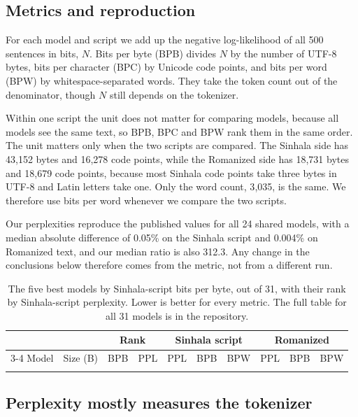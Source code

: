 \documentclass[3p,times,procedia]{elsarticle}
\begin{document}
\subsection{Metrics and reproduction}

For each model and script we add up the negative log-likelihood of all 500 sentences in bits, $N$. Bits per byte (BPB) divides $N$ by the number of UTF-8 bytes, bits per character (BPC) by Unicode code points, and bits per word (BPW) by whitespace-separated words. They take the token count out of the denominator, though $N$ still depends on the tokenizer.

Within one script the unit does not matter for comparing models, because all models see the same text, so BPB, BPC and BPW rank them in the same order. The unit matters only when the two scripts are compared. The Sinhala side has 43{,}152 bytes and 16{,}278 code points, while the Romanized side has 18{,}731 bytes and 18{,}679 code points, because most Sinhala code points take three bytes in UTF-8 and Latin letters take one. Only the word count, 3{,}035, is the same. We therefore use bits per word whenever we compare the two scripts.

Our perplexities reproduce the published values for all 24 shared models, with a median absolute difference of 0.05\% on the Sinhala script and 0.004\% on Romanized text, and our median ratio is also 312.3. Any change in the conclusions below therefore comes from the metric, not from a different run.

\begin{table}[t]
\caption{The five best models by Sinhala-script bits per byte, out of 31, with their rank by Sinhala-script perplexity. Lower is better for every metric. The full table for all 31 models is in the repository.}
\label{tab:top5}
\begin{tabular*}{\hsize}{@{\extracolsep{\fill}}lrrrrrrrrr@{}}
\toprule
& & \multicolumn{2}{c}{Rank} & \multicolumn{3}{c}{Sinhala script} & \multicolumn{3}{c}{Romanized} \\
\cline{3-4}\cline{5-7}\cline{8-10}
Model & Size (B) & BPB & PPL & PPL & BPB & BPW & PPL & BPB & BPW \\
\colrule

\botrule
\end{tabular*}
\end{table}

\subsection{Perplexity mostly measures the tokenizer}
\end{document}
